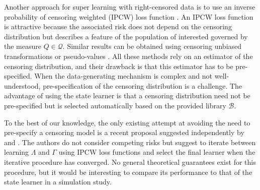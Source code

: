 \documentclass[a4,danish]{article}
\newcommand{\data}{\ensuremath{\mathcal{D}}}
\begin{document}
Another approach for super learning with right-censored data is to use an
inverse probability of censoring weighted (IPCW) loss function
\citep{graf1999assessment,van2003unicv,molinaro2004tree,keles2004asymptotically,hothorn2006survival,gerds2006consistent,gonzalez2021stacked}.
An IPCW loss function is attractive because the associated risk does not depend
on the censoring distribution but describes a feature of the population of
interested governed by the measure \( Q \in \mathcal{Q} \). Similar results can
be obtained using censoring unbiased transformations
\citep{fan1996local,steingrimsson2019censoring} or pseudo-values
\citep{andersen2003generalised,mogensen2013random,sachs2019ensemble}. All these
methods rely on an estimator of the censoring distribution, and their drawback
is that this estimator has to be pre-specified. When the data-generating
mechanism is complex and not well-understood, pre-specification of the censoring
distribution is a challenge. The advantage of using the state learner is that a
censoring distribution need not be pre-specified but is selected automatically
based on the provided library \( \mathcal{B} \).

To the best of our knowledge, the only existing attempt at avoiding the need to
pre-specify a censoring model is a recent proposal suggested independently by
\cite{han2021inverse} and \cite{westling2021inference}. The authors do not
consider competing risks but suggest to iterate between learning \( \Lambda \)
and $\Gamma$ using IPCW loss functions and select the final learner when the
iterative procedure has converged.
No general theoretical guarantees exist for this procedure, but it would be
interesting to compare its performance to that of the state learner in a
simulation study.
\end{document}
